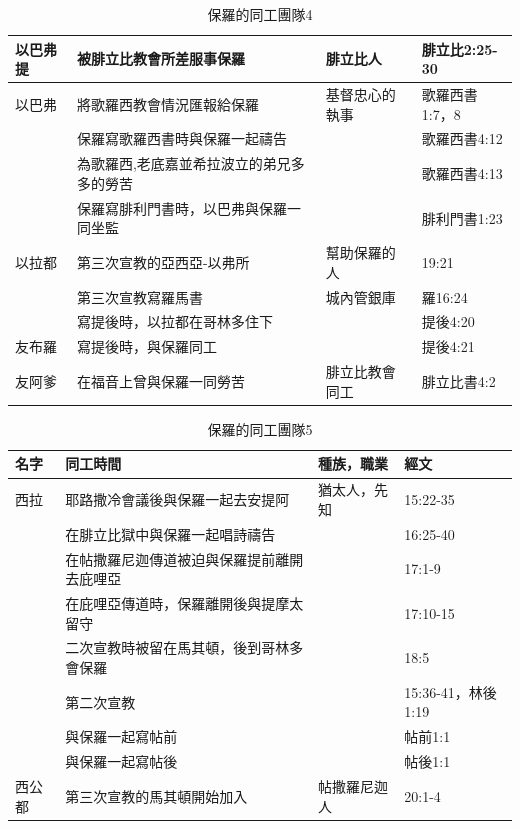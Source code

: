 \begin{table}[htbp]
\begin{tabular}{|l|l|l|l|}
以巴弗提 & 被腓立比教會所差服事保羅&腓立比人 &腓立比2:25-30  \\ \midrule      
以巴弗&將歌羅西教會情況匯報給保羅 &基督忠心的執事 &歌羅西書1:7，8\\
&保羅寫歌羅西書時與保羅一起禱告 & &歌羅西書4:12\\
&為歌羅西,老底嘉並希拉波立的弟兄多多的勞苦 & &歌羅西書4:13\\
&保羅寫腓利門書時，以巴弗與保羅一同坐監 & &腓利門書1:23\\
 \midrule
    以拉都&第三次宣教的亞西亞-以弗所 &幫助保羅的人 &19:21 \\
    &第三次宣教寫羅馬書 & 城內管銀庫&羅16:24 \\
   &寫提後時，以拉都在哥林多住下 &  &提後4:20 \\      
    \midrule  
    
 友布羅 &寫提後時，與保羅同工  &  & 提後4:21 \\ \midrule
友阿爹&在福音上曾與保羅一同勞苦 &腓立比教會同工 &腓立比書4:2\\  

    \bottomrule
    \end{tabular}%
      \caption{保羅的同工團隊4}
  \label{tab:addlabel}%
\end{table}%

\begin{table}[htbp]
  \centering
    \begin{tabular}{|l|l|l|l|}
    \toprule
   名字 & 同工時間  & 種族，職業 &   經文\\ 
      \midrule
      西拉 &耶路撒冷會議後與保羅一起去安提阿 &猶太人，先知 &15:22-35 \\
     &在腓立比獄中與保羅一起唱詩禱告&  &16:25-40 \\
      &在帖撒羅尼迦傳道被迫與保羅提前離開去庇哩亞&  &17:1-9 \\  
       &在庇哩亞傳道時，保羅離開後與提摩太留守&  &17:10-15 \\       
       &二次宣教時被留在馬其頓，後到哥林多會保羅 &  &18:5 \\
     &第二次宣教 &  &15:36-41，林後1:19 \\
      & 與保羅一起寫帖前 && 帖前1:1 \\  
          & 與保羅一起寫帖後 && 帖後1:1 \\                
     \midrule   
     西公都    & 第三次宣教的馬其頓開始加入&帖撒羅尼迦人&20:1-4 \\
     \bottomrule
    \end{tabular}%
      \caption{保羅的同工團隊5}
  \label{tab:addlabel}%
\end{table}%

